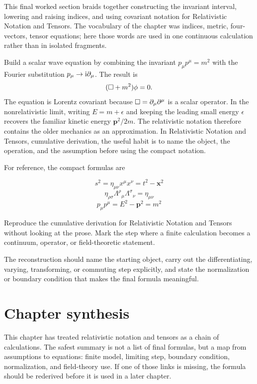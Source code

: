 This final worked section braids together constructing the invariant interval, lowering and raising indices, and using covariant notation for Relativistic Notation and Tensors.  The vocabulary of the chapter was indices, metric, four-vectors, tensor equations; here those words are used in one continuous calculation rather than in isolated fragments.

Build a scalar wave equation by combining the invariant \(p_\mu p^\mu=m^2\) with the Fourier substitution \(p_\mu\to\mathrm i\partial_\mu\).  The result is
\[
  (\Box+m^2)\phi=0.
\]
The equation is Lorentz covariant because \(\Box=\partial_\mu\partial^\mu\) is a scalar operator.  In the nonrelativistic limit, writing \(E=m+\epsilon\) and keeping the leading small energy \(\epsilon\) recovers the familiar kinetic energy \(\bm p^2/2m\).  The relativistic notation therefore contains the older mechanics as an approximation.  In Relativistic Notation and Tensors, cumulative derivation, the useful habit is to name the object, the operation, and the assumption before using the compact notation.

For reference, the compact formulas are

\[
  s^2=\eta_{\mu\nu}x^\mu x^\nu=t^2-\bm x^2
\]
\[
  \eta_{\rho\sigma}\Lambda^\rho{}_\mu\Lambda^\sigma{}_\nu=\eta_{\mu\nu}
\]
\[
  p_\mu p^\mu=E^2-\bm p^2=m^2
\]

\begin{exercise}
Reproduce the cumulative derivation for Relativistic Notation and Tensors without looking at the prose.  Mark the step where a finite calculation becomes a continuum, operator, or field-theoretic statement.
\begin{answer}
The reconstruction should name the starting object, carry out the differentiating, varying, transforming, or commuting step explicitly, and state the normalization or boundary condition that makes the final formula meaningful.
\end{answer}
\end{exercise}



\section{Chapter synthesis}

This chapter has treated relativistic notation and tensors as a chain of calculations.  The safest summary is not a list of final formulas, but a map from assumptions to equations: finite model, limiting step, boundary condition, normalization, and field-theory use.  If one of those links is missing, the formula should be rederived before it is used in a later chapter.

